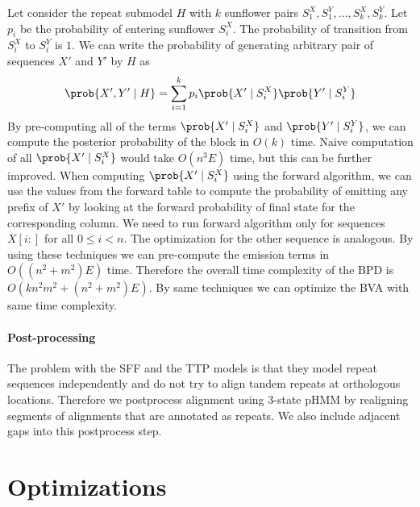 Let consider the repeat submodel $H$ with $k$ sunflower pairs $S^X_1, S^Y_1,
\dots, S^X_k, S^Y_k$. Let $p_i$ be the probability of entering sunflower
$S^X_i$.  The probability of transition from $S^X_i$ to $S^Y_i$ is $1$. We can
write the probability of generating arbitrary pair of sequences $X'$ and $Y'$ by $H$ as
\begin{equation}
\prob{X', Y'\mid H} = \sum_{i=1}^k p_i\prob{X'\mid S^X_i}\prob{Y'\mid S^Y_i}
\end{equation}
By pre-computing all of the terms $\prob{X'\mid S^X_i}$ and $\prob{Y'\mid
S^Y_i}$, we can compute the posterior probability of the block in $O(k)$ time.
Naive computation of all $\prob{X'\mid S^X_i}$ would take $O(n^3E)$ time, but
this can be further improved. When computing $\prob{X'\mid S^X_i}$ using the
forward algorithm, we can use the values from the forward table to compute the
probability of emitting any prefix of $X'$ by looking at the forward
probability of final state for the corresponding column. We need to run forward
algorithm only for sequences $X[i:]$ for all $0\leq i< n$. The optimization for
the other sequence is analogous. By using these techniques we can pre-compute
the emission terms in $O((n^2+m^2)E)$ time. Therefore the overall time
complexity of the BPD is $O(kn^2m^2 + (n^2+m^2)E)$. By
same techniques we can optimize the BVA with same time
complexity.

\paragraph{Post-processing}
The problem with the SFF and the TTP models is that they model repeat sequences
independently and do not try to align tandem repeats at orthologous locations.
Therefore we postprocess alignment using 3-state pHMM by realigning segments of
alignments that are annotated as repeats. We also include adjacent gaps into
this postprocess step.

\section{Optimizations}\label{SECTION:REPOPT}

